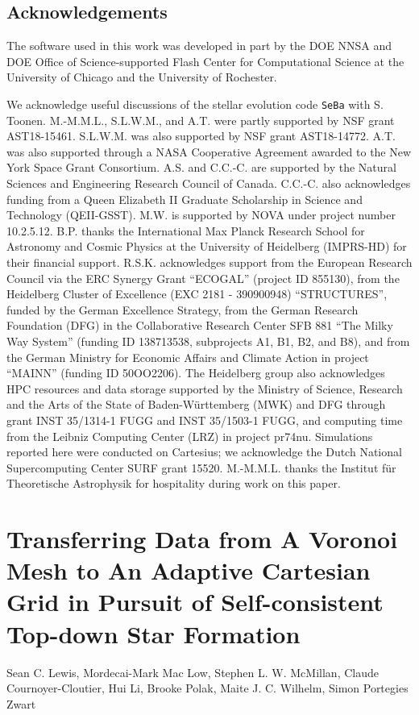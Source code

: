 \documentclass[twoside]{drexel-thesis}
\begin{document}
\begin{thesis}
\section{Acknowledgements}\label{sec:p1-acknowledements}
The software used in this work was developed in part by the DOE NNSA and DOE Office of Science-supported Flash Center for Computational Science at the University of Chicago and the University of Rochester.

We acknowledge useful discussions of the stellar evolution code \texttt{SeBa} with S. Toonen.  
M.-M.M.L., S.L.W.M., and A.T. were partly supported by NSF grant AST18-15461. 
S.L.W.M. was also supported by NSF grant AST18-14772. 
A.T. was also supported through a NASA Cooperative Agreement awarded to the New York Space Grant Consortium. 
A.S. and C.C.-C. are supported by the Natural Sciences and Engineering Research Council of Canada. 
C.C.-C. also acknowledges funding from a Queen Elizabeth II Graduate Scholarship in Science and Technology (QEII-GSST). 
M.W. is supported by NOVA under project number 10.2.5.12. 
B.P. thanks the International Max Planck Research School for Astronomy and Cosmic Physics at the University of Heidelberg (IMPRS-HD) for their financial support. 
R.S.K. acknowledges support from the European Research Council via the ERC Synergy Grant ``ECOGAL'' (project ID 855130), from the Heidelberg Cluster of Excellence (EXC 2181 - 390900948) ``STRUCTURES'', funded by the German Excellence Strategy, from the German Research Foundation (DFG) in the Collaborative Research Center SFB 881 ``The Milky Way System'' (funding ID 138713538, subprojects A1, B1, B2, and B8), and from the German Ministry for Economic Affairs and Climate Action in project ``MAINN'' (funding ID 50OO2206). The Heidelberg group also acknowledges HPC resources and data storage supported by the Ministry of Science, Research and the Arts of the State of Baden-W\"{u}rttemberg (MWK) and DFG through grant INST 35/1314-1 FUGG and INST 35/1503-1 FUGG, and  computing time from the Leibniz Computing Center (LRZ) in project pr74nu. Simulations reported here were conducted on Cartesius; we acknowledge the Dutch National Supercomputing Center SURF grant 15520.  M.-M.M.L. thanks the Institut f\"ur Theoretische Astrophysik for hospitality during work on this paper.

\chapter[VorAMR]{Transferring Data from A Voronoi Mesh to An Adaptive Cartesian Grid in Pursuit of Self-consistent Top-down Star Formation}\label{chp:Paper2}
Sean C. Lewis, Mordecai-Mark Mac Low, Stephen L. W. McMillan,  Claude Cournoyer-Cloutier, Hui Li, Brooke Polak, Maite J. C. Wilhelm, Simon Portegies Zwart


\end{thesis}
\end{document}
